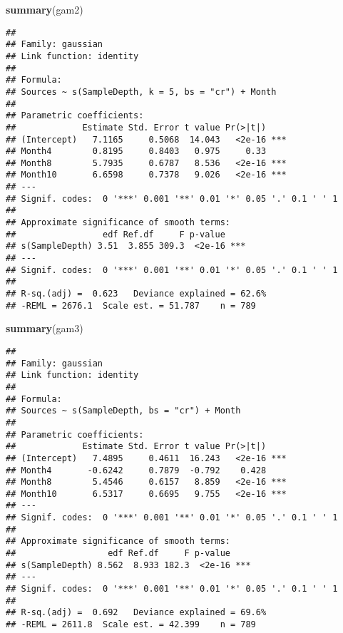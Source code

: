 \documentclass[
]{book}
\newenvironment{Shaded}{\begin{snugshade}}{\end{snugshade}}
\newcommand{\KeywordTok}[1]{\textcolor[rgb]{0.13,0.29,0.53}{\textbf{#1}}}
\newcommand{\NormalTok}[1]{#1}
\begin{document}
\begin{Shaded}
\begin{Highlighting}[]
\KeywordTok{summary}\NormalTok{(gam2)}
\end{Highlighting}
\end{Shaded}

\begin{verbatim}
## 
## Family: gaussian 
## Link function: identity 
## 
## Formula:
## Sources ~ s(SampleDepth, k = 5, bs = "cr") + Month
## 
## Parametric coefficients:
##             Estimate Std. Error t value Pr(>|t|)    
## (Intercept)   7.1165     0.5068  14.043   <2e-16 ***
## Month4        0.8195     0.8403   0.975     0.33    
## Month8        5.7935     0.6787   8.536   <2e-16 ***
## Month10       6.6598     0.7378   9.026   <2e-16 ***
## ---
## Signif. codes:  0 '***' 0.001 '**' 0.01 '*' 0.05 '.' 0.1 ' ' 1
## 
## Approximate significance of smooth terms:
##                 edf Ref.df     F p-value    
## s(SampleDepth) 3.51  3.855 309.3  <2e-16 ***
## ---
## Signif. codes:  0 '***' 0.001 '**' 0.01 '*' 0.05 '.' 0.1 ' ' 1
## 
## R-sq.(adj) =  0.623   Deviance explained = 62.6%
## -REML = 2676.1  Scale est. = 51.787    n = 789
\end{verbatim}

\begin{Shaded}
\begin{Highlighting}[]
\KeywordTok{summary}\NormalTok{(gam3)}
\end{Highlighting}
\end{Shaded}

\begin{verbatim}
## 
## Family: gaussian 
## Link function: identity 
## 
## Formula:
## Sources ~ s(SampleDepth, bs = "cr") + Month
## 
## Parametric coefficients:
##             Estimate Std. Error t value Pr(>|t|)    
## (Intercept)   7.4895     0.4611  16.243   <2e-16 ***
## Month4       -0.6242     0.7879  -0.792    0.428    
## Month8        5.4546     0.6157   8.859   <2e-16 ***
## Month10       6.5317     0.6695   9.755   <2e-16 ***
## ---
## Signif. codes:  0 '***' 0.001 '**' 0.01 '*' 0.05 '.' 0.1 ' ' 1
## 
## Approximate significance of smooth terms:
##                  edf Ref.df     F p-value    
## s(SampleDepth) 8.562  8.933 182.3  <2e-16 ***
## ---
## Signif. codes:  0 '***' 0.001 '**' 0.01 '*' 0.05 '.' 0.1 ' ' 1
## 
## R-sq.(adj) =  0.692   Deviance explained = 69.6%
## -REML = 2611.8  Scale est. = 42.399    n = 789
\end{verbatim}
\end{document}
